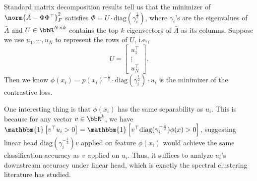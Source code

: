Standard matrix decomposition results tell us that the minimizer of $\norm{\bar{A}-\Phi\Phi^\top}_F^2 $ satisfies $\Phi = U \cdot \text{diag}(\gamma_i^{\frac{1}{2}})$, where $\gamma_i$'s are the eigenvalues of $\bar{A}$ and $U\in\bbR^{N\times k}$ contains the top $k$ eigenvectors of $\bar{A}$ as its columns. Suppose we use $u_1, \cdots, u_N$ to represent the rows of $U$, i.e., 
	\begin{equation}
	U = \begin{bmatrix}  u_1^\top  \\ \vdots \\  u_N^\top \end{bmatrix}.
\end{equation}
Then we know $\phi(x_i)= p(x_i)^{-\frac{1}{2}} \cdot \text{diag}(\gamma_i^{\frac{1}{2}}) \cdot u_i$ is the minimizer of the contrastive loss. 

\newcommand{\id}[1]{\mathbbm{1}\left[#1\right]}

One interesting thing is that $\phi(x_i)$ has the same separability as $u_i$. This is because for any vector $v\in\bbR^k$, we have $\id{v^\top u_i>0} = \id{v^\top \text{diag}(\gamma_i^{-\frac{1}{2}}) \phi(x) >0}$, suggesting linear head $\text{diag}(\gamma_i^{-\frac{1}{2}}) v$ applied on feature $\phi(x_i)$ would achieve the same classification accuracy as $v$ applied on $u_i$. Thus, it suffices to analyze $u_i$'s downstream accuracy under linear head, which is exactly the spectral clustering literature has studied.

